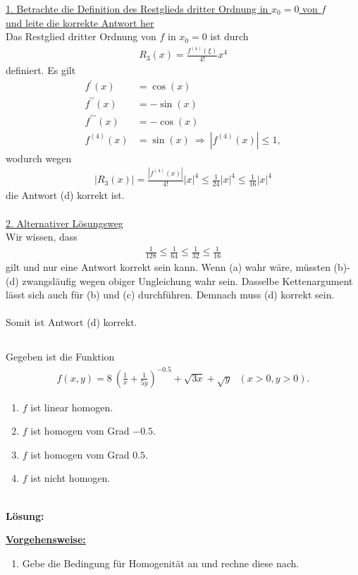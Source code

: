 \underline{1. Betrachte die Definition des Restglieds dritter Ordnung in $ x_0 = 0 $ von $ f $ \\ und leite die korrekte Antwort her}\\
Das Restglied dritter Ordnung von $ f $ in $ x_0 = 0 $ ist durch
\begin{align*}
R_3(x)
= 
\frac{f^{(4)}(\xi)}{4!} x^4
\end{align*}
definiert.
Es gilt 
\begin{align*}
f^\prime(x) &= \cos(x)\\
f^{\prime \prime}(x) &= - \sin(x)\\
f^{\prime \prime \prime}(x) &= - \cos(x)\\
f^{(4)}(x) &= \sin(x) 
\ \Rightarrow \
| f^{(4)}(x) | \leq 1,
\end{align*}
wodurch wegen
\begin{align*}
|R_3(x)|
= \frac{| f^{(4)}(x) |}{4!} |x|^4
\leq 
\frac{1}{24} |x|^4 
\leq
\frac{1}{16} |x|^4
\end{align*}
die Antwort (d) korrekt ist.
\\
\\
\underline{2. Alternativer Lösungsweg}\\
Wir wissen, dass 
\begin{align*}
\frac{1}{128} \leq \frac{1}{64} \leq \frac{1}{32} \leq \frac{1}{16}
\end{align*}
gilt und nur eine Antwort korrekt sein kann.
Wenn (a) wahr wäre, müssten (b)-(d) zwangsläufig wegen obiger Ungleichung wahr sein.
Dasselbe Kettenargument lässt sich auch für (b) und (c) durchführen.
Demnach muss (d) korrekt sein.
\\
\\
Somit ist Antwort (d) korrekt.
\newpage

\subsection*{}
Gegeben ist die Funktion
\begin{align*}
f(x,y) = 8 \ \left( \frac{1}{x} + \frac{1}{5  y} \right)^{-0.5}
+ \sqrt{3  x} + \sqrt{y} \ \ \
(x > 0 , y > 0).
\end{align*}
\renewcommand{\labelenumi}{(\alph{enumi})}
\begin{enumerate}
	\item 
	$ f $ ist linear homogen.
	\item
	$ f $ ist homogen vom Grad $ -0.5 $.
	\item
	$ f $ ist homogen vom Grad $ 0.5 $.
	\item
	$ f $ ist nicht homogen.
\end{enumerate}
\ \\
\textbf{Lösung:}
\begin{mdframed}
\underline{\textbf{Vorgehensweise:}}
\renewcommand{\labelenumi}{\theenumi.}
\begin{enumerate}
\item Gebe die Bedingung für Homogenität an und rechne diese nach.
\end{enumerate}
\end{mdframed}

